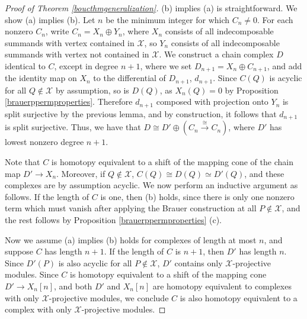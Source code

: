 \documentclass[10pt,letterpaper, boxed, cm]{amsart}
\newcommand{\calX}{\mathcal{X}}
\theoremstyle{remark}
\theoremstyle{definition}
\begin{document}
	\begin{proof}[Proof of Theorem \ref{boucthmgeneralization}]
	    (b) implies (a) is straightforward. We show (a) implies (b). Let $n$ be the minimum integer for which $C_n \neq 0$. For each nonzero $C_n$, write $C_n = X_n \oplus Y_n$, where $X_n$ consists of all indecomposable summands with vertex contained in $\mathcal{X}$, so $Y_n$ consists of all indecomposable summands with vertex not contained in $\mathcal{X}$. We construct a chain complex $D$ identical to $C$, except in degree $n+1$, where we set $D_{n+1} = X_n \oplus C_{n+1}$, and add the identity map on $X_n$  to the differential of $D_{n+1}$, $d_{n+1}$. Since $C(Q)$ is acyclic for all $Q \not \in \calX$ by assumption, so is $D(Q)$, as $X_n(Q) = 0$ by Proposition \ref{brauerppermproperties}. Therefore $d_{n+1}$ composed with projection onto $Y_n$ is split surjective by the previous lemma, and by construction, it follows that $d_{n+1}$ is split surjective. Thus, we have that $D \cong D' \oplus (C_n \xrightarrow{\cong} C_n)$, where $D'$ has lowest nonzero degree $n+1$.

		Note that $C$ is homotopy equivalent to a shift of the mapping cone of the chain map $D' \to X_n$. Moreover, if $Q \not\in \calX$, $C(Q) \cong D(Q) \simeq D'(Q)$, and these complexes are by assumption acyclic. We now perform an inductive argument as follows. If the length of $C$ is one, then (b) holds, since there is only one nonzero term which must vanish after applying the Brauer construction at all $P \not\in \calX$, and the rest follows by Proposition \ref{brauerppermproperties} (c).

        Now we assume (a) implies (b) holds for complexes of length at most $n$, and suppose $C$ has length $n+1$. If the length of $C$ is $n+1$, then $D'$ has length $n$. Since $D'(P)$ is also acyclic for all $P \not\in \calX$, $D'$ contains only $\calX$-projective modules. Since $C$ is homotopy equivalent to a shift of the mapping cone $D' \to X_n[n]$, and both $D'$ and $X_n[n]$ are homotopy equivalent to complexes with only $\calX$-projective modules, we conclude $C$ is also homotopy equivalent to a complex with only $\calX$-projective modules.
	\end{proof}
\end{document}
